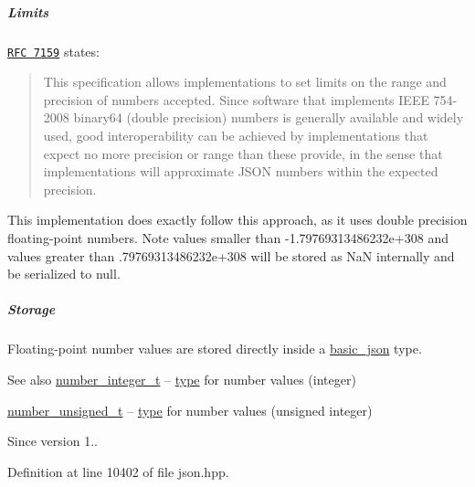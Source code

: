\subparagraph*{Limits}

\href{http://rfc7159.net/rfc7159}{\tt R\+FC 7159} states\+: \begin{quote}
This specification allows implementations to set limits on the range and precision of numbers accepted. Since software that implements I\+E\+EE 754-\/2008 binary64 (double precision) numbers is generally available and widely used, good interoperability can be achieved by implementations that expect no more precision or range than these provide, in the sense that implementations will approximate J\+S\+ON numbers within the expected precision. \end{quote}


This implementation does exactly follow this approach, as it uses double precision floating-\/point numbers. Note values smaller than {\ttfamily -\/1.\+79769313486232e+308} and values greater than {.\+79769313486232e+308} will be stored as NaN internally and be serialized to {\ttfamily null}.

\subparagraph*{Storage}

Floating-\/point number values are stored directly inside a \hyperlink{classnlohmann_1_1basic__json}{basic\+\_\+json} type.

\begin{DoxySeeAlso}{See also}
\hyperlink{classnlohmann_1_1basic__json_a98e611d67b7bd75307de99c9358ab2dc}{number\+\_\+integer\+\_\+t} -- \hyperlink{classnlohmann_1_1basic__json_a2b2d781d7f2a4ee41bc0016e931cadf7}{type} for number values (integer)

\hyperlink{classnlohmann_1_1basic__json_ab906e29b5d83ac162e823ada2156b989}{number\+\_\+unsigned\+\_\+t} -- \hyperlink{classnlohmann_1_1basic__json_a2b2d781d7f2a4ee41bc0016e931cadf7}{type} for number values (unsigned integer)
\end{DoxySeeAlso}
\begin{DoxySince}{Since}
version 1.. 
\end{DoxySince}


Definition at line 10402 of file json.\+hpp.

\mbox{\label{classnlohmann_1_1basic__json_a98e611d67b7bd75307de99c9358ab2dc}} 
